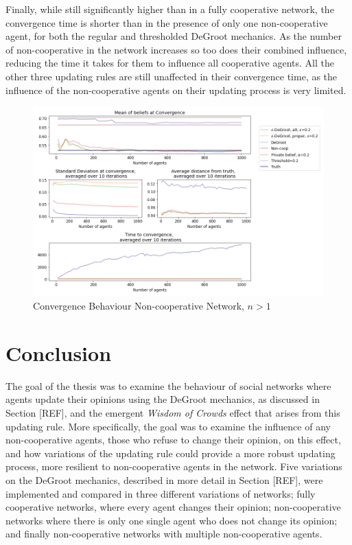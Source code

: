 \documentclass[a4paper, 12pt]{report}
\begin{document}
\noindent Finally, while still significantly higher than in a fully cooperative network, the convergence time is shorter than in the presence of only one non-cooperative agent, for both the regular and thresholded DeGroot mechanics. As the number of non-cooperative in the network increases so too does their combined influence, reducing the time it takes for them to influence all cooperative agents. All the other three updating rules are still unaffected in their convergence time, as the influence of the non-cooperative agents on their updating process is very limited.

\begin{center}
    \begin{figure}[!htbp]
        \centering
        \includegraphics[width=1.2\textwidth]{ThesisKI/Images/WisdomCompare2.png}
        \caption{Convergence Behaviour Non-cooperative Network, $n>1$}
        \label{noncoop+:compare}
    \end{figure}
\end{center}

\newpage

\chapter{Conclusion}

The goal of the thesis was to examine the behaviour of social networks where agents update their opinions using the DeGroot mechanics, as discussed in Section [REF], and the emergent \emph{Wisdom of Crowds} effect that arises from this updating rule. More specifically, the goal was to examine the influence of any non-cooperative agents, those who refuse to change their opinion, on this effect, and how variations of the updating rule could provide a more robust updating process, more resilient to non-cooperative agents in the network. Five variations on the DeGroot mechanics, described in more detail in Section [REF], were implemented and compared in three different variations of networks; fully cooperative networks, where every agent changes their opinion; non-cooperative networks where there is only one single agent who does not change its opinion; and finally non-cooperative networks with multiple non-cooperative agents. 
\end{document}
